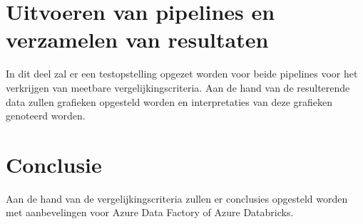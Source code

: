 \section{Uitvoeren van pipelines en verzamelen van resultaten}

In dit deel zal er een testopstelling opgezet worden voor beide pipelines voor het verkrijgen van meetbare vergelijkingscriteria. Aan de hand van de resulterende data zullen grafieken opgesteld worden en interpretaties van deze grafieken genoteerd worden.

\section{Conclusie}

Aan de hand van de vergelijkingscriteria zullen er conclusies opgesteld worden met aanbevelingen voor Azure Data Factory of Azure Databricks.


